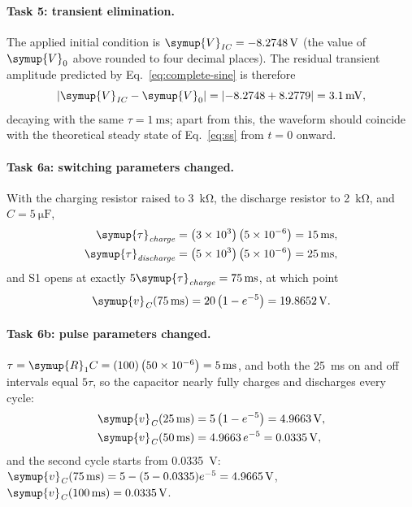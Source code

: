 \documentclass[12pt,a4paper]{article}
\begin{document}
	\paragraph{Task 5: transient elimination.}
	The applied initial condition is
	$\symup{V}_{\mathit{IC}} = \SI{-8.2748}{\volt}$ (the value of $\symup{V}_{0}$ above rounded to
	four decimal places).  The residual transient amplitude predicted by
	Eq.~\eqref{eq:complete-sine} is therefore
	\begin{equation}
		\left|\symup{V}_{\mathit{IC}} - \symup{V}_{0}\right| = \left|-8.2748 + 8.2779\right|
		= \SI{3.1}{\milli\volt},
	\end{equation}
	decaying with the same $\tau = \SI{1}{\milli\second}$; apart from
	this, the waveform should coincide with the theoretical steady state
	of Eq.~\eqref{eq:ss} from $t = 0$ onward.
	
	\paragraph{Task 6a: switching parameters changed.}
	With the charging resistor raised to \SI{3}{\kilo\ohm}, the
	discharge resistor to \SI{2}{\kilo\ohm}, and
	$C = \SI{5}{\micro\farad}$,
	\begin{align}
		\symup{\tau}_{\mathit{charge}} &= \left(3\times 10^{3}\right)\left(5\times 10^{-6}\right)
		= \SI{15}{\milli\second}, \\
		\symup{\tau}_{\mathit{discharge}} &= \left(5\times 10^{3}\right)\left(5\times 10^{-6}\right)
		= \SI{25}{\milli\second},
	\end{align}
	and S1 opens at exactly $5\symup{\tau}_{\mathit{charge}} =
	\SI{75}{\milli\second}$, at which point
	\begin{equation}
		\symup{v}_{\mathit{C}}(\SI{75}{\milli\second}) = 20\left(1 - e^{-5}\right)
		= \SI{19.8652}{\volt}.
	\end{equation}
	
	\paragraph{Task 6b: pulse parameters changed.}
	$\tau = \symup{R}_{1} C = (100)\left(50\times 10^{-6}\right) =
	\SI{5}{\milli\second}$, and both the \SI{25}{\milli\second} on and
	off intervals equal $5\tau$, so the capacitor nearly fully charges
	and discharges every cycle:
	\begin{align}
		\symup{v}_{\mathit{C}}(\SI{25}{\milli\second}) &= 5\left(1 - e^{-5}\right)
		= \SI{4.9663}{\volt},\\
		\symup{v}_{\mathit{C}}(\SI{50}{\milli\second}) &= 4.9663\, e^{-5} = \SI{0.0335}{\volt},
	\end{align}
	and the second cycle starts from \SI{0.0335}{\volt}:
	$\symup{v}_{\mathit{C}}(\SI{75}{\milli\second}) = 5 - (5 - 0.0335)e^{-5} =
	\SI{4.9665}{\volt}$, $\symup{v}_{\mathit{C}}(\SI{100}{\milli\second}) = \SI{0.0335}{\volt}$.
	
\end{document}
